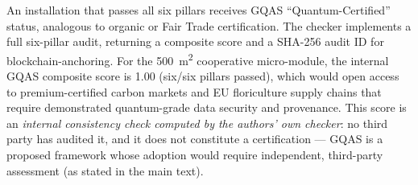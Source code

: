 \documentclass[11pt,a4paper]{article}
\begin{document}
An installation that passes all six pillars receives GQAS ``Quantum-Certified'' status, analogous to organic or Fair Trade certification. The checker implements a full six-pillar audit, returning a composite score and a SHA-256 audit ID for blockchain-anchoring. For the \qty{500}{\m\squared} cooperative micro-module, the internal GQAS composite score is 1.00 (six/six pillars passed), which would open access to premium-certified carbon markets and EU floriculture supply chains that require demonstrated quantum-grade data security and provenance. This score is an \textit{internal consistency check computed by the authors' own checker}: no third party has audited it, and it does not constitute a certification --- GQAS is a proposed framework whose adoption would require independent, third-party assessment (as stated in the main text).





\end{document}
